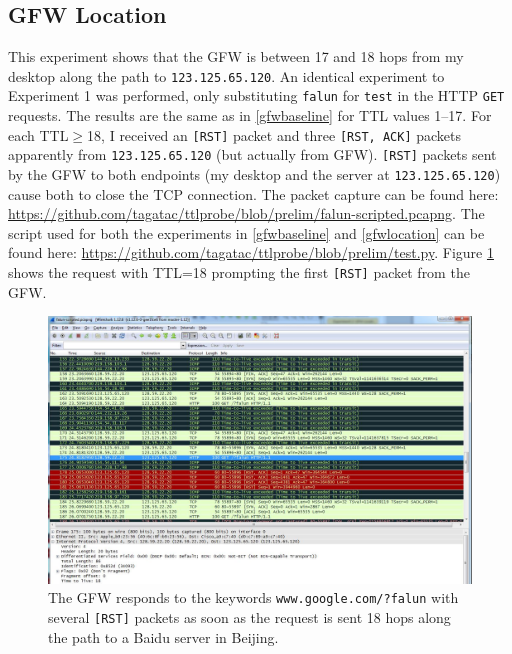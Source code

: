 \subsection{GFW Location}\label{gfwlocation}
This experiment shows that the GFW is between 17 and 18 hops from my desktop along the path to \texttt{123.125.65.120}.
An identical experiment to Experiment 1 was performed, only substituting \texttt{falun} for \texttt{test} in the HTTP \texttt{GET} requests.
The results are the same as in \autoref{gfwbaseline} for TTL values 1--17.
For each TTL$\geq$18, I received an \texttt{[RST]} packet and three \texttt{[RST, ACK]} packets apparently from \texttt{123.125.65.120} (but actually from GFW).
\texttt{[RST]} packets sent by the GFW to both endpoints (my desktop and the server at \texttt{123.125.65.120}) cause both to close the TCP connection.
The packet capture can be found here: \url{https://github.com/tagatac/ttlprobe/blob/prelim/falun-scripted.pcapng}.
The script used for both the experiments in \autoref{gfwbaseline} and \autoref{gfwlocation} can be found here: \url{https://github.com/tagatac/ttlprobe/blob/prelim/test.py}.
Figure \ref{fig_gfwfalun} shows the request with TTL=18 prompting the first \texttt{[RST]} packet from the GFW.
\begin{figure}
	\includegraphics[width=\textwidth]{figures/gfwfalun}
	\caption{The GFW responds to the keywords \texttt{www.google.com/?falun} with several \texttt{[RST]} packets as soon as the request is sent 18 hops along the path to a Baidu server in Beijing.}
	\label{fig_gfwfalun}
\end{figure}
